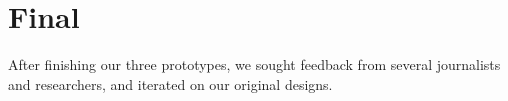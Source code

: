 \section{Final}
After finishing our three prototypes, we sought feedback from several journalists and researchers, and iterated on our original designs. 



